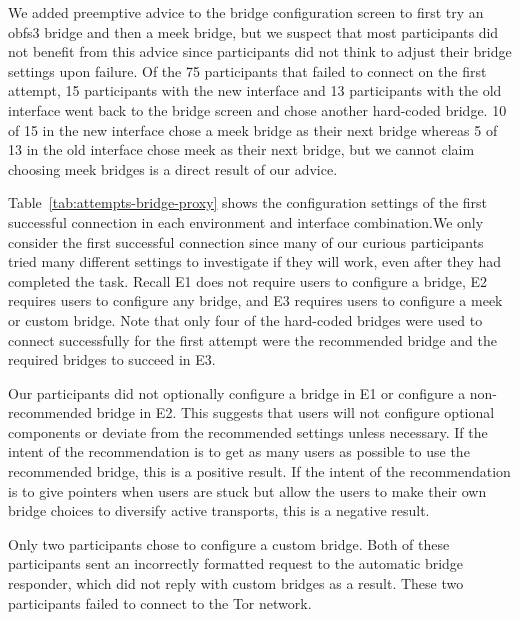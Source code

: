 \documentclass[USenglish,oneside,twocolumn]{article}
\begin{document}
{%

We added preemptive advice to the bridge configuration screen to first try an obfs3 bridge and then a meek bridge, but we suspect that most participants did not benefit from this advice since participants did not think to adjust their bridge settings upon failure. Of the 75 participants that failed to connect on the first attempt, 15 participants with the new interface and 13 participants with the old interface went back to the bridge screen and chose another hard-coded bridge. 10 of 15 in the new interface chose a meek bridge as their next bridge whereas 5 of 13 in the old interface chose meek as their next bridge, but we cannot claim choosing meek bridges is a direct result of our advice.

Table~\ref{tab:attempts-bridge-proxy} shows the configuration settings of the first successful connection in each environment and interface combination.We only consider the first successful connection since many of our curious participants tried many different settings to investigate if they will work, even after they had completed the task. Recall E1 does not require users to configure a bridge, E2 requires users to configure any bridge, and E3 requires users to configure a meek or custom bridge. Note that only four of the hard-coded bridges were used to connect successfully for the first attempt were the recommended bridge and the required bridges to succeed in E3.

Our participants did not optionally configure a bridge in E1 or configure a non-recommended bridge in E2. This suggests that users will not configure optional components or deviate from the recommended settings unless necessary. If the intent of the recommendation is to get as many users as possible to use the recommended bridge, this is a positive result. If the intent of the recommendation is to give pointers when users are stuck but allow the users to make their own bridge choices to diversify active transports, this is a negative result. 

Only two participants chose to configure a custom bridge. Both of these participants sent an incorrectly formatted request to the automatic bridge responder, which did not reply with custom bridges as a result. These two participants failed to connect to the Tor network. 

}
\end{document}
